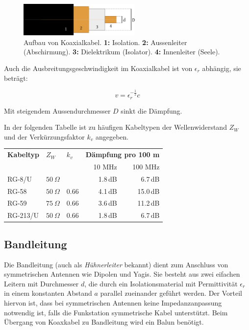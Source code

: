 \begin{figure}[h!]
 \centering
 \includegraphics[width=6cm]{./png/Koax.png}
 \caption{Aufbau von Koaxialkabel. \textbf{1:} Isolation. \textbf{2:} Aussenleiter (Abschirmung). \textbf{3:} Dielektrikum (Isolator). \textbf{4:} Innenleiter (Seele). }
 \label{fig:coax}
\end{figure}

Auch die Ausbreitungsgeschwindigkeit im Koaxialkabel ist von $\epsilon_r$ abhängig, sie beträgt:

\[v = \epsilon_r^{-\frac{1}{2}} c\]

Mit steigendem Aussendurchmesser $D$ sinkt die Dämpfung.


In der folgenden Tabelle ist zu häufigen Kabeltypen der Wellenwiderstand $Z_W$ und der Verkürzungsfaktor $k_v$ angegeben.

\vspace{1em}
\begin{tabular}{lll rr}
\bfseries Kabeltyp & \boldmath $Z_W$ & \boldmath $k_v$ & \multicolumn{2}{c}{\bfseries Dämpfung pro 100 m} \\
                   &                            &                             & \small 10 MHz & \small 100 MHz \\
\toprule \arrayrulecolor{rowsep}
RG-8/U   & $50~\Omega$ &      & 1.8\,dB & 6.7\,dB \\ \midrule
RG-58    & $50~\Omega$ & 0.66 & 4.1\,dB & 15.0\,dB \\ \midrule
RG-59    & $75~\Omega$ & 0.66 & 3.6\,dB & 11.2\,dB \\ \midrule
RG-213/U & $50~\Omega$ & 0.66 & 1.8\,dB & 6.7\,dB  \\ \midrule
\end{tabular}
\vspace{1em}


\subsection{Bandleitung}
Die Bandleitung (auch als \textit{Hühnerleiter} bekannt) dient zum Anschluss von symmetrischen Antennen wie Dipolen und Yagis. Sie besteht aus zwei eifachen Leitern mit Durchmesser $d$, die durch ein Isolationsmaterial mit Permittivität $\epsilon_r$ in einem konstanten Abstand $a$ parallel zueinander geführt werden. Der Vorteil hiervon ist, dass bei symmetrischen Antennen keine Impedanzanpassung notwendig ist, falls die Funkstation symmetrische Kabel unterstützt. Beim Übergang von Koaxkabel zu Bandleitung wird ein Balun benötigt.

